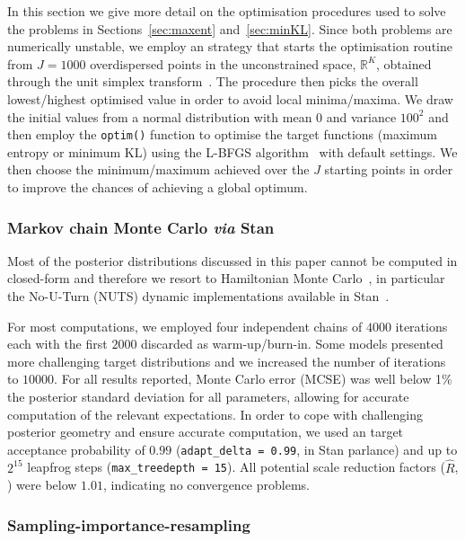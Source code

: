 \documentclass[12pt]{article}
\begin{document}
In this section we give more detail on the optimisation procedures used to solve the problems in Sections~\ref{sec:maxent} and~\ref{sec:minKL}.
Since both problems are numerically unstable, we employ an strategy that starts the optimisation routine from $J = 1000$ overdispersed points in the unconstrained space, $\mathbb{R}^K$, obtained through the unit simplex transform~\parencite{Betancourt2012}.
The procedure then picks the overall lowest/highest optimised value in order to avoid local minima/maxima.
We draw the initial values from a normal distribution with mean $0$ and variance $100^2$ and then employ the \verb|optim()| function to optimise the target functions (maximum entropy or minimum KL) using the L-BFGS algorithm~\parencite{Byrd1995} with default settings.
We then choose the minimum/maximum achieved over the $J$ starting points in order to improve the chances of achieving a global optimum.

\subsubsection{Markov chain Monte Carlo \textit{via} Stan}
\label{sec:computation_mcmc}

Most of the posterior distributions discussed in this paper cannot be computed in closed-form and therefore we resort to Hamiltonian Monte Carlo~\parencite{Neal2011}, in particular the No-U-Turn (NUTS) dynamic implementations available in Stan~\parencite{Hoffman2014,Betancourt2017}.

For most computations, we employed four independent chains of $4000$ iterations each with the first $2000$ discarded as warm-up/burn-in.
Some models presented more challenging target distributions and we increased the number of iterations to $10 000$.
For all results reported, Monte Carlo error (MCSE) was well below 1\% the posterior standard deviation for all parameters, allowing for accurate computation of the relevant expectations.
In order to cope with challenging posterior geometry and ensure accurate computation, we used an target  acceptance probability of $0.99$ (\verb|adapt_delta = 0.99|, in Stan parlance) and up to $2^{15}$ leapfrog steps (\verb|max_treedepth = 15|).
All potential scale reduction factors ($\hat{R}$, \textcite{Gelman1992}) were below $1.01$, indicating no convergence problems.

\subsubsection{Sampling-importance-resampling}
\label{sec:spIR}
\end{document}
